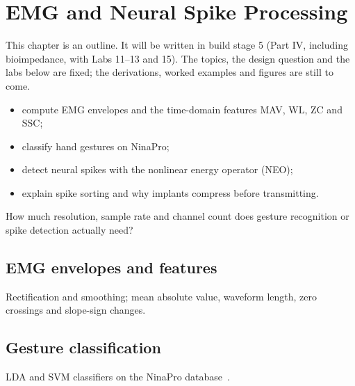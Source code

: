 \chapter{EMG and Neural Spike Processing}\label{ch:emg}

\begin{specnote}
This chapter is an outline. It will be written in build stage 5 (Part IV, including bioimpedance, with Labs 11--13 and 15). The topics, the design question and the labs below are fixed; the derivations, worked examples and figures are still to come.
\end{specnote}

\begin{objectives}
\begin{itemize}
  \item compute EMG envelopes and the time-domain features MAV, WL, ZC and SSC;
  \item classify hand gestures on NinaPro;
  \item detect neural spikes with the nonlinear energy operator (NEO);
  \item explain spike sorting and why implants compress before transmitting.
\end{itemize}
\end{objectives}

\begin{insight}
How much resolution, sample rate and channel count does gesture recognition or spike detection actually need?
\end{insight}

\section{EMG envelopes and features}\label{sec:ch26-1}
Rectification and smoothing; mean absolute value, waveform length, zero crossings and slope-sign changes.

\section{Gesture classification}\label{sec:ch26-2}
LDA and SVM classifiers on the NinaPro database~\cite{ninapro}.

